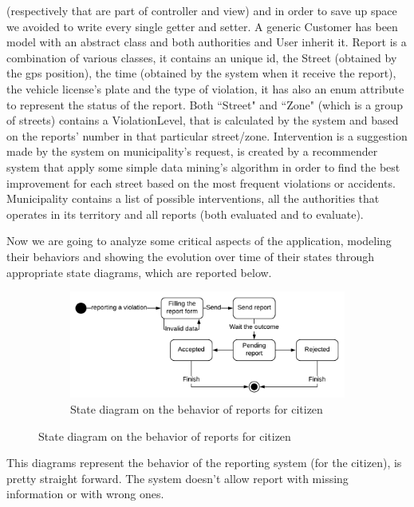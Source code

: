 \documentclass[12pt,a4paper]{report}
\begin{document}
		(respectively that are part of controller and view) and in order to save up space we avoided to write every single getter and setter.
		A generic Customer has been model with an abstract class and both authorities and User inherit it.
		Report is a combination of various classes, it contains an unique id, the Street (obtained by the gps position), the time (obtained
		by the system when it receive the report), the vehicle license's plate and the type of violation, it has also an enum attribute
		to represent the status of the report. Both ``Street" and ``Zone" (which is a group of streets) contains a ViolationLevel, that
		is calculated by the system and based on the reports' number in that particular street/zone. Intervention is a suggestion made
		by the system on municipality's request, is created by a recommender system that apply some simple data mining's algorithm
		in order to find the best improvement for each street based on the most frequent violations or accidents.
		Municipality contains a list of possible interventions, all the authorities that operates in its territory and all reports
		(both evaluated and to evaluate).

		
		Now we are going to analyze some critical aspects of the application, modeling their behaviors and	
		showing the evolution over time of their	states	through appropriate state diagrams, which are
		reported below.
		
		\begin{figure}[H]
			\begin{subfigure}{\textwidth}
				\includegraphics[scale = 0.75, center]{reportC}
				\caption{State diagram on the behavior of reports for citizen}
			\end{subfigure}
		\end{figure}
		This diagrams represent the behavior of the reporting system (for the citizen), is pretty straight forward. The system doesn't allow report
		with missing information or with wrong ones.
		
\end{document}

